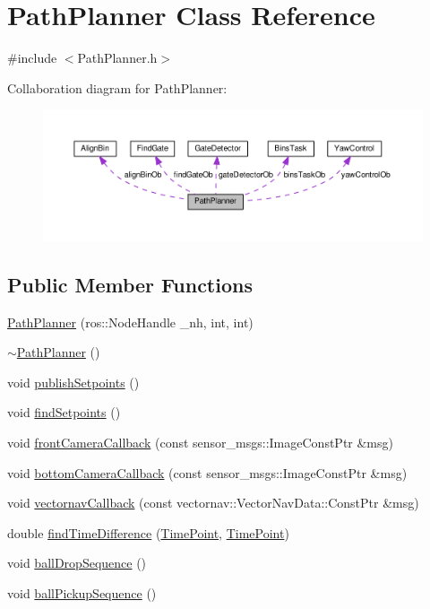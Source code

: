 \hypertarget{classPathPlanner}{}\section{Path\+Planner Class Reference}
\label{classPathPlanner}


{\ttfamily \#include $<$Path\+Planner.\+h$>$}



Collaboration diagram for Path\+Planner\+:\nopagebreak
\begin{figure}[H]
\begin{center}
\leavevmode
\includegraphics[width=350pt]{classPathPlanner__coll__graph}
\end{center}
\end{figure}
\subsection*{Public Member Functions}
\begin{DoxyCompactItemize}
\item 
\hyperlink{classPathPlanner_a64afb30132b2f7079bc24bfc7c97810d}{Path\+Planner} (ros\+::\+Node\+Handle \+\_\+nh, int, int)
\item 
\hyperlink{classPathPlanner_a61bd61f848e519df56b75eddd3732ab8}{$\sim$\+Path\+Planner} ()
\item 
void \hyperlink{classPathPlanner_a9606656f6008c9915c351e87e3b3db1f}{publish\+Setpoints} ()
\item 
void \hyperlink{classPathPlanner_a67e0129f08f6df984e407992d3804890}{find\+Setpoints} ()
\item 
void \hyperlink{classPathPlanner_ada3d9b80cf5f40c329046ca149e8ba8f}{front\+Camera\+Callback} (const sensor\+\_\+msgs\+::\+Image\+Const\+Ptr \&msg)
\item 
void \hyperlink{classPathPlanner_a9473e9625d617bd0c5b900245195feac}{bottom\+Camera\+Callback} (const sensor\+\_\+msgs\+::\+Image\+Const\+Ptr \&msg)
\item 
void \hyperlink{classPathPlanner_a9b5d663206c906f2fc991153fea7bff0}{vectornav\+Callback} (const vectornav\+::\+Vector\+Nav\+Data\+::\+Const\+Ptr \&msg)
\item 
double \hyperlink{classPathPlanner_a006986912bf894921948056bf8ed1b5a}{find\+Time\+Difference} (\hyperlink{thruster__driver_8cpp_ad3e807c387dc076de974ff7eac67ad81}{Time\+Point}, \hyperlink{thruster__driver_8cpp_ad3e807c387dc076de974ff7eac67ad81}{Time\+Point})
\item 
void \hyperlink{classPathPlanner_ac2818eba3b1035732ca548c87d12d30d}{ball\+Drop\+Sequence} ()
\item 
void \hyperlink{classPathPlanner_a225c5c983e296b81c97c74b94ec2bea0}{ball\+Pickup\+Sequence} ()
\end{DoxyCompactItemize}
